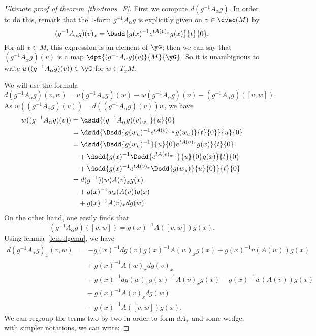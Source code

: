 \begin{proof}[Ultimate proof of theorem~\ref{tho:trans_F}]
First we compute $d(g^{-1} A_{\alpha} g)$. In order to do this, remark that the $1$-form $g^{-1} A_{\alpha} g$ is explicitly given on $v\in\cvec(M)$ by
\[
   (g^{-1} A_{\alpha} g)(v)_x=\Dsdd{g(x)^{-1} e^{tA(v)_x}g(x)}{t}{0}.
\]
For all $x\in M$, this expression is an element of $\yG$; then we can say that $(g^{-1} A_{\alpha} g)(v)$ is a map $\dpt{(g^{-1} A_{\alpha} g)(v)}{M}{\yG}$. So it is unambiguous to write $w((g^{-1} A_{\alpha} g)(v))\in\yG$ for $w\in T_xM$.

We will use the formula
\[
   d(g^{-1} A_{\alpha} g)(v,w)=v(g^{-1} A_{\alpha} g)(w)-w(g^{-1} A_{\alpha} g)(v)-(g^{-1} A_{\alpha} g)([v,w]).
\]
As $w((g^{-1} A_{\alpha} g)(v))=d((g^{-1} A_{\alpha} g)(v))w$, we have
\begin{equation}
\begin{split}
    w((g^{-1} A_{\alpha} g)(v))&=\dsdd{(g^{-1} A_{\alpha} g)(v)_{w_u}}{u}{0}\\
                &=\dsdd{ \Dsdd{g(w_u)^{-1} e^{tA(v)_{w_u}}g(w_u)}{t}{0}  }{u}{0}\\
		&=\dsdd{  \Dsdd{g(w_u)^{-1}}{u}{0} e^{tA(v)_x}g(x)  }{t}{0}\\
		&\quad+\dsdd{ g(x)^{-1} \Dsdd{e^{tA(v)_{w_u}}}{u}{0} g(x)  }{t}{0}\\
		&\quad+\dsdd{  g(x)^{-1} e^{tA(v)_x} \Dsdd{g(w_u)}{u}{0}  }{t}{0}\\
		&=d(g^{-1})(w)A(v)_xg(x)\\
		&\quad+g(x)^{-1} w_x(A(v))g(x)\\
		&\quad+g(x)^{-1} A(v)_x dg(w).
\end{split}
\end{equation}
On the other hand, one easily finds that
\[
     (g^{-1} A_{\alpha} g)([v,w])=g(x)^{-1} A([v,w])g(x).
\]
 Using lemma~\ref{lem:dgemu}, we have
\begin{equation}
\begin{split}
   d(g^{-1} A_{\alpha} g)_x(v,w)&=-g(x)^{-1} dg(v)g(x)^{-1} A(w)_xg(x)+g(x)^{-1} v(A(w))g(x)\\&\quad+g(x)^{-1} A(w)_xdg(v)_x\\
                   &\quad+g(x)^{-1} dg(w)_xg(x)^{-1} A(v)_xg(x)-g(x)^{-1} w(A(v))g(x)\\&\quad-g(x)^{-1} A(v)_xdg(w)\\
		   &\quad-g(x)^{-1} A([v,w])g(x).
\end{split}
\end{equation}
We can regroup the terms two by two in order to form $dA_{\alpha}$ and some wedge; with simpler notations, we can write:

\end{proof}

